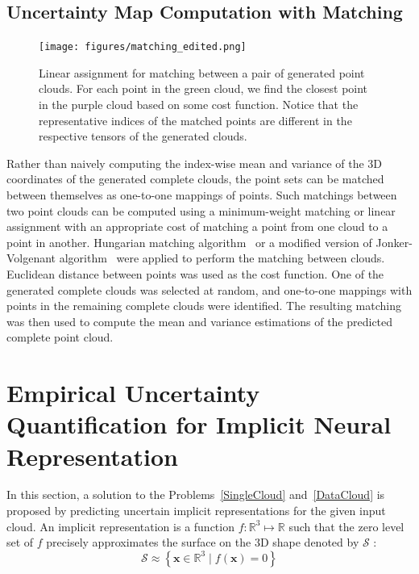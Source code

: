     \subsection{Uncertainty Map Computation with Matching}
    \begin{figure}[htb]
      \begin{center}
      \texttt{[image: figures/matching\_edited.png]}
      \end{center}
      \caption{Linear assignment for matching between a pair of generated point clouds. For each point in the green cloud, we find the closest point in the purple cloud based on some cost function. Notice that the representative indices of the matched points are different in the respective tensors of the generated clouds.}\label{fig:matching}
    \end{figure}
    Rather than naively computing the index-wise mean and variance of the 3D coordinates of the generated complete clouds, the point sets can be matched between themselves as one-to-one mappings of points. Such matchings between two point clouds can be computed using a minimum-weight matching or linear assignment with an appropriate cost of matching a point from one cloud to a point in another. Hungarian matching algorithm~\cite{Hungarian} or a modified version of Jonker-Volgenant algorithm~\cite{RectAssign} were applied to perform the matching between clouds. Euclidean distance between points was used as the cost function. One of the generated complete clouds was selected at random, and one-to-one mappings with points in the remaining complete clouds were identified. The resulting matching was then used to compute the mean and variance estimations of the predicted complete point cloud.


\section{Empirical Uncertainty Quantification for Implicit Neural Representation}\label{euqinr}
In this section, a solution to the Problems~\ref{SingleCloud} and~\ref{DataCloud} is proposed by predicting uncertain implicit representations for the given input cloud. An implicit representation is a function $f: \mathbb{R}^{3} \mapsto \mathbb{R}$ such that the zero level set of $f$ precisely approximates the surface on the 3D shape denoted by $\mathcal{S}$ :
\begin{equation}
\mathcal{S} \approx \left\{\mathbf{x} \in \mathbb{R}^{3} \mid f(\mathbf{x})=0\right\}
\end{equation}
\newline

